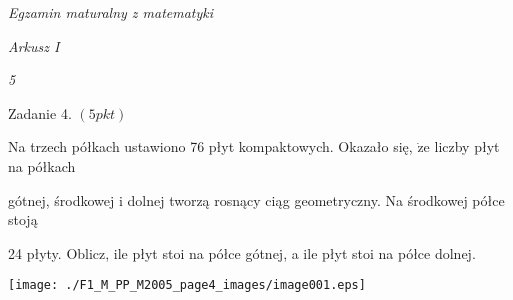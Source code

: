\documentclass[a4paper,12pt]{article}
\begin{document}
{\it Egzamin maturalny z matematyki}

{\it Arkusz I}

{\it 5}

Zadanie 4. $(5pkt)$

Na trzech półkach ustawiono 76 płyt kompaktowych. Okazało się, $\dot{\mathrm{z}}\mathrm{e}$ liczby płyt na półkach

gótnej, środkowej i dolnej tworzą rosnący ciąg geometryczny. Na środkowej półce stoją

24 płyty. Oblicz, ile płyt stoi na półce gótnej, a ile płyt stoi na półce dolnej.
\begin{center}
\texttt{[image: ./F1\_M\_PP\_M2005\_page4\_images/image001.eps]}
\end{center}
\end{document}
